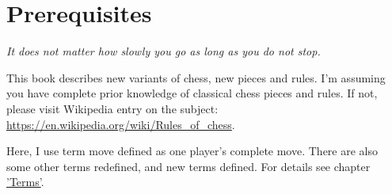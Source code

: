 

\chapter*{Prerequisites}
\label{ch:Prerequisites}

\begin{flushright}
\parbox{0.7\textwidth}{
\emph{It does not matter how slowly you go as long as you do not stop. \\
 } }
\end{flushright}

\noindent
This book describes new variants of chess, new pieces and rules. I'm assuming you have complete prior
knowledge of classical chess pieces and rules. If not, please visit Wikipedia entry on the subject: \\
\href{https://en.wikipedia.org/wiki/Rules\_of\_chess}{https://en.wikipedia.org/wiki/Rules\_of\_chess}.

Here, I use term move defined as one player's complete move. There are also some other terms redefined,
and new terms defined. For details see chapter \hyperref[ch:Terms]{'Terms'}.

\clearpage %
